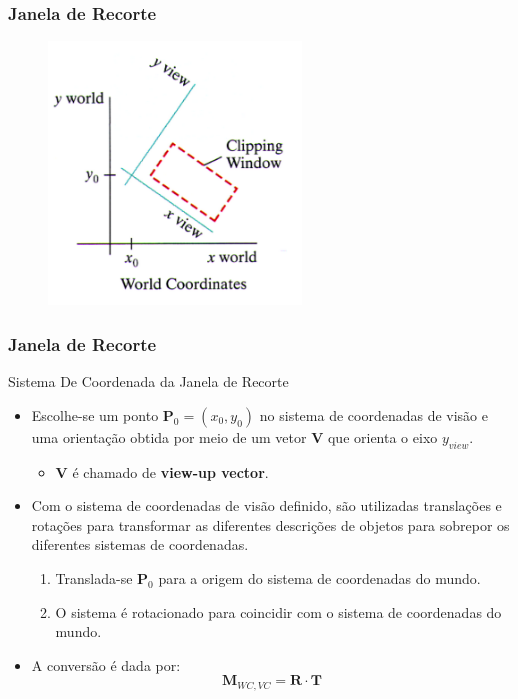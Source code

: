 \documentclass{beamer}
\begin{document}
\begin{frame}
\frametitle{Janela de Recorte}

	\begin{figure}[!h]
				\begin{center}
					\includegraphics[width=0.6\textwidth]{Figures/janRec}
				\end{center}
			\end{figure}	
\end{frame}
\begin{frame}
\frametitle{Janela de Recorte}

	\begin{block}{Sistema De Coordenada da Janela de Recorte}
		\begin{itemize}
			\item<1->	Escolhe-se um ponto $\textbf{P}_0 = (x_0,y_0)$ no sistema de coordenadas de visão e uma orientação obtida por meio de um vetor $\textbf{V}$ que orienta o eixo $y_{view}$.  
			\begin{itemize}
				\item \textbf{V} é chamado de \textbf{view-up vector}.
			\end{itemize}
			\item<2-> Com o sistema de coordenadas de visão definido, são utilizadas translações e rotações para transformar as diferentes descrições de objetos para sobrepor os diferentes sistemas de coordenadas.
			\begin{enumerate}
				\item Translada-se $\textbf{P}_0$ para a origem do sistema de coordenadas do mundo.
				\item O sistema é rotacionado para coincidir com o sistema de coordenadas do mundo.
			\end{enumerate}	
			\item<3-> A conversão é dada por:\\
				\begin{equation*}
					\textbf{M}_{WC,VC} = \textbf{R} \cdot \textbf{T}
				\end{equation*}						 
		\end{itemize}
		
	\end{block}
\end{frame}
\end{document}
